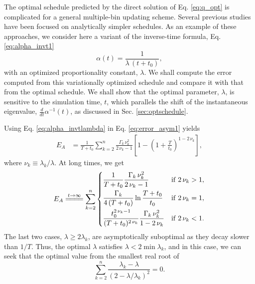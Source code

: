 \documentclass[reprint, floatfix]{revtex4-1}
\newcommand{\Err}{E}
\begin{document}
The optimal schedule predicted
by the direct solution of Eq. \eqref{eq:q_opt}
is complicated for a general
multiple-bin updating scheme.
%
Several previous studies\cite{marsili2006, barducci2008, dickson2011}
have been focused on analytically simpler schedules.
%
As an example of these approaches,
we consider here a variant of
the inverse-time formula, Eq. \eqref{eq:alpha_invt1}
%
\begin{equation}
\alpha(t) = \frac{1}{\lambda \, (t + t_0) },
\label{eq:alpha_invtlambda}
\end{equation}
%
with an optimized proportionality constant, $\lambda$.
%
We shall compute the error computed from
this variationally optimized schedule
and compare it with that from the optimal schedule.
%
We shall show that the optimal parameter, $\lambda$,
is sensitive to the simulation time, $t$,
which parallels the shift of
the instantaneous eigenvalue,
$\frac{d}{dt}\alpha^{-1}(t)$,
as discussed in Sec. \ref{sec:optschedule}.


Using Eq. \eqref{eq:alpha_invtlambda}
in Eq. \eqref{eq:error_asym1} yields
%
\begin{align}
\Err_A
&=
\frac{    1    }
     { T + t_0 }
\sum_{k = 2}^n
  \frac{ \Gamma_k \, \nu_k^2 }
       {    2 \, \nu_k - 1   }
\left[
  1 - \left(
        1 + \frac{ T }{ t_0 }
      \right)^{1 - 2 \, \nu_k}
\right],
\label{eq:error_asym_invt}
\end{align}
%
where $\nu_k \equiv \lambda_k / \lambda$.
%
At long times, we get
$$
\begin{aligned}
  \Err_A
  \stackrel{         t \to \infty         }
           { =\joinrel=\joinrel=\joinrel= }
  \sum_{k = 2}^n
  \begin{dcases}
    \frac{    1    }
         { T + t_0 }
    \frac{ \Gamma_k \, \nu_k^2 }
         {   2 \, \nu_k - 1    }
    &
    \mathrm{if \;} 2 \, \nu_k > 1,
    \\%
    \frac{    \Gamma_k    }
         { 4 \, (T + t_0) }
    \ln \frac{ T + t_0 }
             {   t_0   }
    &
    \mathrm{if \;} 2 \, \nu_k = 1,
    \\
    \frac{  t_0^{ 2 \, \nu_k  - 1}  }
         { (T + t_0)^{ 2 \, \nu_k } }
    \frac{ \Gamma_k \, \nu_k^2 }
         {   1 - 2 \, \nu_k    }
    &
    \mathrm{if \;} 2 \, \nu_k < 1.
  \end{dcases}
\end{aligned}
$$
%
The last two cases, $\lambda \ge 2\lambda_k$,
are asymptotically suboptimal
as they decay slower than $1/T$.
%
Thus, the optimal $\lambda$
satisfies $\lambda < 2 \min \lambda_k$,
and in this case,
we can seek that
the optimal value from
the smallest real root of
%
\begin{equation}
\sum_{k = 2}^n
\frac{ \lambda_k - \lambda }
{ \left(2 - \lambda/ \lambda_k \right)^2 }
= 0.
\label{eq:optimal_lambda_approx}
\end{equation}
\end{document}
